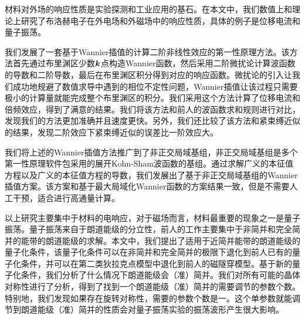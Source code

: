\begin{cabstract}
  材料对外场的响应性质是实验探测和工业应用的基石。在本文中，我们数值上和理论上研究了布洛赫电子在外电场和外磁场中的响应性质，具体的例子是位移电流和量子振荡。

  我们发展了一套基于Wannier插值的计算二阶非线性效应的第一性原理方法。该方法首先通过布里渊区少数$\boldsymbol{k}$点构造Wannier函数，然后采用二阶微扰论计算波函数的导数和二阶导数，最后在布里渊区积分得到对应的响应函数。微扰论的引入让我们成功地规避了数值求导中遇到的相位不定性问题，Wannier插值让该过程只需要极小的计算量就能完成整个布里渊区的积分。我们采用这个方法计算了位移电流和倍频效应，得到了满意的结果。我们将该方法和前人的波函数求和规则进行对比，发现我们的方法更加准确并且速度更快。另外，我们还比较了该方法和紧束缚近似的结果，发现二阶效应下紧束缚近似的误差比一阶效应大。

  我们将上述的Wannier插值方法推广到了非正交局域基组，非正交局域基组是多个第一性原理软件包采用的展开Kohn-Sham波函数的基组。通过求解广义的本征值方程以及广义的本征值方程的导数，我们发展出了基于非正交局域基组的Wannier插值方案。该方案和基于最大局域化Wannier函数的方案结果一致，但是不需要人工干预，适合进行高通量计算。

  以上研究主要集中于材料的电响应，对于磁场而言，材料最重要的现象之一是量子振荡。量子振荡来自于朗道能级的分立性，前人的工作主要集中于非简并和完全简并的能带的朗道能级的求解。本文中，我们提出了适用于近简并能带的朗道能级的量子化条件，该量子化条件可以在非简并和完全简并的极限下退化到前人已有的量子化条件，并可以在第二类狄拉克点模型中退化到前人的磁隧穿模型。基于新的量子化条件，我们分析了什么情况下朗道能级会（准）简并。我们对所有可能的晶体对称性进行了分析，得到了找到一个朗道能级（准）简并的需要调节的参数个数。特别地，我们发现如果存在旋转对称性，需要的参数个数是一。这个单参数就能调节到朗道能级（准）简并的性质会对量子振荡实验的振荡波形产生很大影响。
\end{cabstract}


